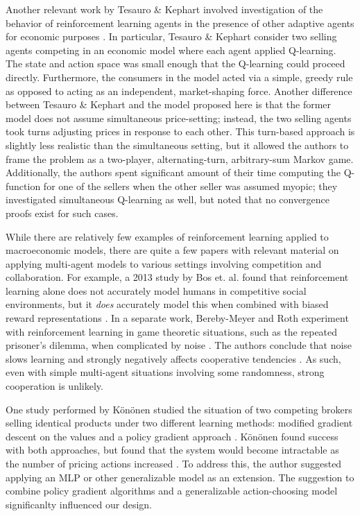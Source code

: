 \documentclass[twoside,twocolumn]{article}
\begin{document}
\medskip

Another relevant work by Tesauro \& Kephart involved investigation of the behavior of reinforcement learning agents in the presence of other adaptive agents for economic purposes \cite{pricing-multi-agent}. In particular, Tesauro \& Kephart consider two selling agents competing in an economic model where each agent applied Q-learning. The state and action space was small enough that the Q-learning could proceed directly. Furthermore, the consumers in the model acted via a simple, greedy rule as opposed to acting as an independent, market-shaping force. Another difference between Tesauro \& Kephart and the model proposed here is that the former model does not assume simultaneous price-setting; instead, the two selling agents took turns adjusting prices in response to each other. This turn-based approach is slightly less realistic than the simultaneous setting, but it allowed the authors to frame the problem as a two-player, alternating-turn, arbitrary-sum Markov game. Additionally, the authors spent significant amount of their time computing the Q-function for one of the sellers when the other seller was assumed myopic; they investigated simultaneous Q-learning as well, but noted that no convergence proofs exist for such cases.

\medskip 

While there are relatively few examples of reinforcement learning applied to macroeconomic models, there are quite a few papers with relevant material on applying multi-agent models to various settings involving competition and collaboration. For example, a 2013 study by Bos et. al. found that reinforcement learning alone does not accurately model humans in competitive social environments, but it \textit{does} accurately model this when combined with biased reward representations \cite{vandenBos2137}. In a separate work, Bereby-Meyer and Roth experiment with reinforcement learning in game theoretic situations, such as the repeated prisoner's dilemma, when complicated by noise \cite{10.1257/aer.96.4.1029}. The authors conclude that noise slows learning and strongly negatively affects cooperative tendencies \cite{10.1257/aer.96.4.1029}. As such, even with simple multi-agent situations involving some randomness, strong cooperation is unlikely.

\medskip

One study performed by K\"on\"onen studied the situation of two competing brokers selling identical products under two different learning methods: modified gradient descent on the values and a policy gradient approach \cite{doi:10.1002/int.20121}. K\"on\"onen found success with both approaches, but found that the system would become intractable as the number of pricing actions increased \cite{doi:10.1002/int.20121}. To address this, the author suggested applying an MLP or other generalizable model as an extension. The suggestion to combine policy gradient algorithms and a generalizable action-choosing model significanlty influenced our design. 
\end{document}
